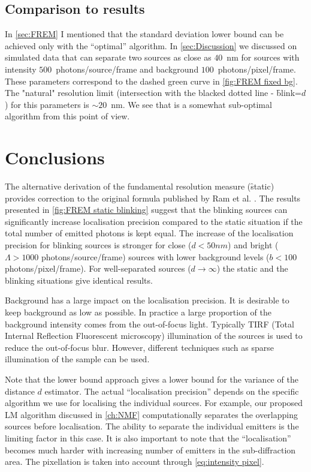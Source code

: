 
\subsection{Comparison to \inmf{} results\label{sec:comparison to inmf}}
%
In \autoref{sec:FREM} I mentioned that the standard deviation lower bound can be achieved only with the ``optimal'' algorithm. In \autoref{sec:Discussion} we discussed on simulated data that \inmf{} can separate two sources as close as $40$~nm for sources with intensity $500$~photons/source/frame and background $100$~photons/pixel/frame. These parameters correspond to the dashed green curve in \autoref{fig:FREM fixed bg}. The "natural" resolution limit (intersection with the blacked dotted line - \f{blink}=$d$) for this parameters is $\sim20$~nm. We see that \inmf{} is a somewhat sub-optimal algorithm from this point of view.
\afterpage{\clearpage}

\section{Conclusions} 

The alternative derivation of the fundamental resolution measure (\f{static}) provides correction to the original formula published by Ram et al. \cite{Ram2006}. The results presented in \autoref{fig:FREM static blinking} suggest that the blinking sources can significantly increase localisation precision compared to the static situation if the total number of emitted photons is kept equal. The increase of the localisation precision for blinking sources is stronger for close ($d<50\unit{nm}$) and bright ($\Lambda>1000$ photons/source/frame) sources with lower background levels ($b<100$ photons/pixel/frame). For well-separated sources ($d\rightarrow\infty$) the static and the blinking situations give identical results. 

Background has a large impact on the localisation precision. It is desirable to keep background as low as possible. In practice a large proportion of the background intensity comes from the out-of-focus light. Typically TIRF (Total Internal Reflection Fluorescent microscopy) illumination of the sources is used to reduce the out-of-focus blur. However, different techniques such as sparse illumination of the sample can be used. 

Note that the \CR lower bound approach gives a lower bound for the variance of the distance $d$ estimator. The actual ``localisation precision'' depends on the specific algorithm we use for localising the individual sources. For example, our proposed LM algorithm discussed in \autoref{ch:NMF} computationally separates the overlapping sources before localisation. The ability to separate the individual emitters is the limiting factor in this case. It is also important to note that the ``localisation'' becomes much harder with increasing number of emitters in the sub-diffraction area. The pixellation is taken into account through \autoref{eq:intensity pixel}.

